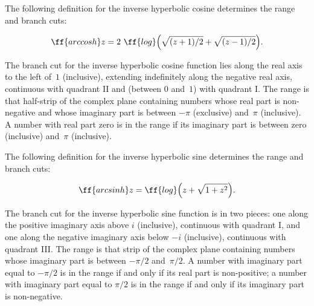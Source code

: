 The following definition for the inverse hyperbolic cosine
determines the range and branch cuts:

$$ \ff{arccosh} z = 2\ \ff{log} \Bigl(\sqrt{(z+1)/2} + \sqrt{(z-1)/2}\Bigr). $$


The branch cut for the inverse hyperbolic cosine function
lies along the real axis to the left of~$1$ (inclusive), extending
indefinitely along the negative real axis, continuous with quadrant II
and (between $0$ and~$1$) with quadrant I.
The range is that half-strip of the complex plane containing numbers whose
real part is non-negative and whose imaginary
part is between $-\pi$ (exclusive) and~$\pi$ (inclusive).
A number with real part zero is in the range 
if its imaginary part is between zero (inclusive) and~$\pi$ (inclusive).

The following definition for the inverse hyperbolic sine determines
the range and branch cuts:


$$ \ff{arcsinh} z = \ff{log} \Bigl(z+\sqrt{1+z^2}\Bigr). $$



The branch cut for the inverse hyperbolic sine function is in two pieces:
one along the positive imaginary axis above $i$
(inclusive), continuous with quadrant I, and one along the negative imaginary
axis below $-i$ (inclusive), continuous with quadrant III.
The range is that strip of the complex plane containing numbers whose imaginary
part is between $-\pi/2$ and~$\pi/2$.  A number with imaginary
part equal to $-\pi/2$ is in the range if and only if its real
part is non-positive; a number with imaginary part equal to $\pi/2$ is in
the range if and only if its imaginary part is non-negative.


